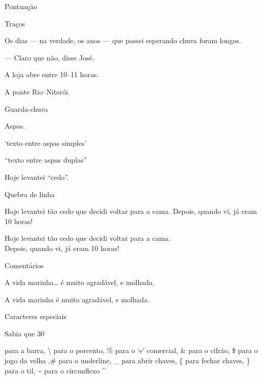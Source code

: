 \documentclass[12pt]{memoir}
\begin{document}
Pontuação


Traços

Os dias --- na verdade, os anos ---
que passei esperando chuva foram
longos.

--- Claro que não, disse José.

A loja abre entre 10--11 horas.

A ponte Rio--Niterói.

Guarda-chuva



Aspas.

`texto entre aspas simples'

``texto entre aspas duplas''

Hoje levantei ``cedo''.


Quebra de linha


Hoje levantei tão cedo que decidi voltar para a cama. \newline
Depois, quando vi, já eram 10 horas!

Hoje levantei tão cedo que decidi voltar para a cama. \\
Depois, quando vi, já eram 10 horas!







Comentários %


A vida marinha\ldots
é muito agradável, e molhada.



A vida marinha é muito agradável, e molhada.




Caracteres especiais


Sabia que 30%

para a barra, \textbackslash \newline
para o porcento, \%          \newline
para o `e' comercial, \&     \newline
para o cifrão, \$            \newline
para o jogo da velha ,\#     \newline
para o underline, \_         \newline
para abrir chaves, \{        \newline
para fechar chaves, \}       \newline
para o til, \~               \newline
para o circunflexo \^        \newline
\end{document}
